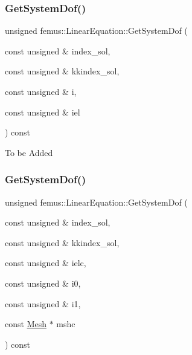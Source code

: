 \subsubsection{\texorpdfstring{Get\+System\+Dof()}{GetSystemDof()}\hspace{0.1cm}{\footnotesize\ttfamily [1/3]}}
{\footnotesize\ttfamily unsigned femus\+::\+Linear\+Equation\+::\+Get\+System\+Dof (\begin{DoxyParamCaption}\item[{const unsigned \&}]{index\+\_\+sol,  }\item[{const unsigned \&}]{kkindex\+\_\+sol,  }\item[{const unsigned \&}]{i,  }\item[{const unsigned \&}]{iel }\end{DoxyParamCaption}) const}

To be Added \mbox{\label{classfemus_1_1_linear_equation_a97d5328122e7841e3edd0713947b2031}} 
\subsubsection{\texorpdfstring{Get\+System\+Dof()}{GetSystemDof()}\hspace{0.1cm}{\footnotesize\ttfamily [2/3]}}
{\footnotesize\ttfamily unsigned femus\+::\+Linear\+Equation\+::\+Get\+System\+Dof (\begin{DoxyParamCaption}\item[{const unsigned \&}]{index\+\_\+sol,  }\item[{const unsigned \&}]{kkindex\+\_\+sol,  }\item[{const unsigned \&}]{ielc,  }\item[{const unsigned \&}]{i0,  }\item[{const unsigned \&}]{i1,  }\item[{const \mbox{\hyperlink{classfemus_1_1_mesh}{Mesh}} $\ast$}]{mshc }\end{DoxyParamCaption}) const}

\mbox{\label{classfemus_1_1_linear_equation_a6215eca33ce5d030718985a8cb05eaab}} 
